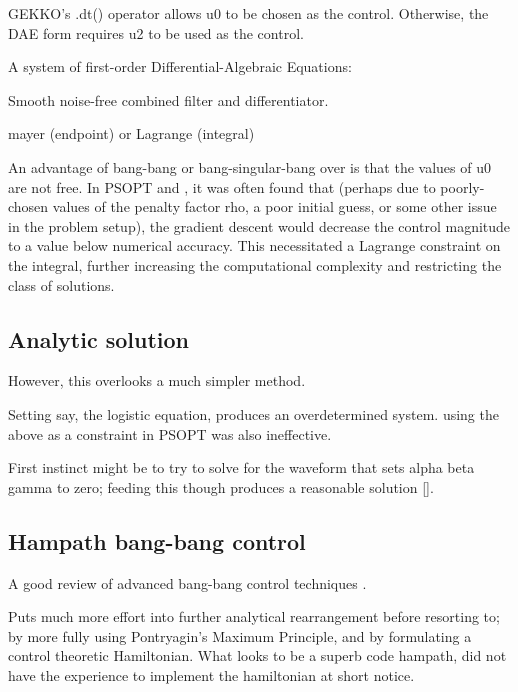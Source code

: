 \documentclass[fleqn,10pt]{paper}
\begin{document}



GEKKO's .dt() operator allows u0 to be chosen as the control. 
Otherwise, the DAE form requires u2 to be used as the control.

A system of first-order Differential-Algebraic Equations:

Smooth noise-free combined filter and differentiator.

mayer (endpoint) or Lagrange (integral)

An advantage of bang-bang or bang-singular-bang over is that the values of u0 are not free. In PSOPT and , it was often found that (perhaps due to poorly-chosen values of the penalty factor rho, a poor initial guess, or some other issue in the problem setup), the gradient descent would decrease the control magnitude to a value below numerical accuracy. This necessitated a Lagrange constraint on the integral, further increasing the computational complexity and restricting the class of solutions. 



\subsection*{Analytic solution}


However, this overlooks a much simpler method.

Setting say, the logistic equation, produces an overdetermined system. using the above as a constraint in PSOPT was also ineffective.

\begin{tcolorbox}
	First instinct might be to try to solve for the waveform that sets alpha beta gamma to zero; feeding this though produces a reasonable solution []. 
\end{tcolorbox}

\subsection*{Hampath bang-bang control}

A good review of advanced bang-bang control techniques \cite{Computations2004}. 

Puts much more effort into further analytical rearrangement before resorting to; by more fully using Pontryagin's Maximum Principle, and by formulating a control theoretic Hamiltonian. What looks to be a superb code hampath, did not have the experience to implement the hamiltonian at short notice.
\end{document}
